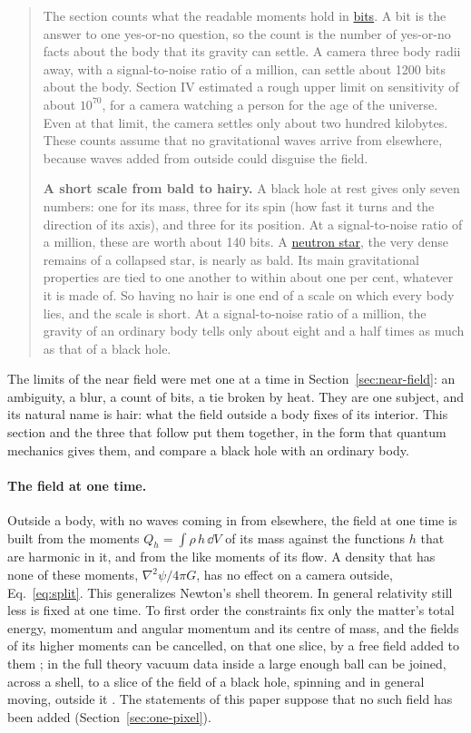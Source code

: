 \begin{quote}
The section counts what the readable moments hold in
\href{https://en.wikipedia.org/wiki/Bit}{bits}. A bit is the answer to one
yes-or-no question, so the count is the number of yes-or-no facts about the
body that its gravity can settle. A camera three body radii away, with a
signal-to-noise ratio of a million, can settle about 1200 bits about the body.
Section IV estimated a rough upper limit on sensitivity of about $10^{70}$,
for a camera watching a person for the age of the universe. Even at that limit,
the camera settles only about two hundred kilobytes. These counts assume that
no gravitational waves arrive from elsewhere, because waves added from outside
could disguise the field.

\textbf{A short scale from bald to hairy.} A black hole at rest gives only seven
numbers: one for its mass, three for its spin (how fast it turns and the
direction of its axis), and three for its position. At a signal-to-noise ratio
of a million, these are worth about 140 bits. A
\href{https://en.wikipedia.org/wiki/Neutron_star}{neutron star}, the very dense
remains of a collapsed star, is nearly as bald. Its main gravitational
properties are tied to one another to within about one per cent, whatever it is
made of. So having no hair is one end of a scale on which every body lies, and
the scale is short. At a signal-to-noise ratio of a million, the gravity of an
ordinary body tells only about eight and a half times as much as that of a black hole.
\end{quote}

The limits of the near field were met one at a time in
Section~\ref{sec:near-field}: an ambiguity, a blur, a count of bits, a tie
broken by heat. They are one subject, and its natural name is hair:
what the field outside a body fixes of its interior. This
section and the three that follow put them together, in the form that
quantum mechanics gives them, and compare a black hole with an ordinary body.

\paragraph{The field at one time.} Outside a body, with no waves coming in from elsewhere,
the field at one time is built from the moments
$Q_h = \int\rho\,h\,\dd V$ of its mass against the functions $h$ that are
harmonic in it, and from the like moments of its flow. A density that has none
of these moments, $\nabla^2\psi/4\pi G$, has no effect on a camera
outside, Eq.~\eqref{eq:split}. This generalizes Newton's shell theorem.
In general relativity still less is fixed at one time. To first
order the constraints fix only the matter's total energy, momentum and angular
momentum and its centre of mass, and the fields of its higher moments can be
cancelled, on that one slice, by a free field added to them
\cite{DonnellyGiddings2017}; in the full theory vacuum data inside a large
enough ball can be joined, across a shell, to a slice of the field of a black
hole, spinning and in general moving, outside it \cite{CorvinoSchoen2006}. The statements of this paper suppose that no such field
has been added (Section~\ref{sec:one-pixel}).

